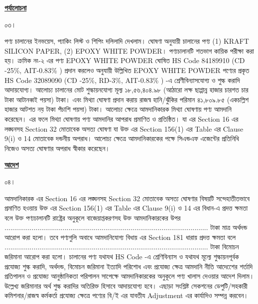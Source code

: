 \documentclass[12pt]{article}
\begin{document}
\begin{center}
\textbf{\underline{পর্যালোচনা}}
\end{center}
\begin{minipage}[t]{0.05\linewidth}
০৩।
\end{minipage}
\begin{minipage}[t]{0.95\linewidth}
পণ্য চালানের ইনভয়েস, প্যাকিং লিস্ট ও
শিপিং দলিলাদি দেখলাম।
ঘোষণা অনুযায়ী চালানের পণ্য
(1) KRAFT SILICON PAPER,
(2) EPOXY WHITE POWDER।
পণ্যচালানটি শতভাগ কায়িক পরীক্ষা করা হয়।
ক্রমিক নং-২ এর পণ্য
EPOXY WHITE POWDER
ঘোষিত HS Code 84189910
(CD -25\%, AIT-0.83\% )
প্রদান করলেও
{\fsen}
অনুযায়ী উল্লিখিত
EPOXY WHITE POWDER
পণ্যের প্রকৃত HS Code 32089090
(CD -25\%, RD-3\%, AIT-0.83\% ) -এ
শ্রেণীবিন্যাসযোগ্য ও শুল্ক করাদি আদায়যোগ্য।
আলোচ্য চালানের মোট
শুল্কায়নযোগ্য মূল্য
১৮,৫৬,৪০৪.৯৮ (আঠারো লক্ষ ছাপ্পান্ন হাজার চারশত চার টাকা আটানব্বই পয়সা) টাকা।
এবং মিথ্যা ঘোষণা প্রদান করায় রাজস্ব হানি/ঝুঁকির পরিমান
৪১,৮০৯.৮৫
(একচল্লিশ হাজার আটশত নয় টাকা পঁচাশি পয়সা) টাকা।
আলোচ্য ক্ষেত্রে আমদানিকারক মিথ্যা ঘোষণায়
পণ্য আমদানি করেছেন।
এর ফলে মিথ্যা ঘোষণায় পণ্য আমদানির আপরাধ
প্রমাণিত ও প্রতিষ্ঠিত।
যা {\tca} এর Section 16 এর
লঙ্ঘনসহ Section 32 মোতাবেক
অসত্য ঘোষণা যা উক্ত {\tca}
এর Section 156(1) এর Table এর
Clause 9(i) ও 14 মোতাবেক দন্ডনীয় অপরাধ।
আলোচ্য ক্ষেত্রে আমদানিকারকের পক্ষে সিএন্ডএফ
এজেন্টের প্রতিনিধি নিজেও অসত্য ঘোষণার অপরাধ
স্বীকার করেছেন।
\end{minipage}
\begin{center}
\textbf{\underline{আদেশ}}
\end{center}
\begin{minipage}[t]{0.05\linewidth}
০৪।
\end{minipage}
\begin{minipage}[t]{0.95\linewidth}
আমদানিকারক {\tca} এর Section 16
এর লঙ্ঘনসহ Section 32 মোতাবেক
অসত্য ঘোষণার বিষয়টি সন্দেহাতীতভাবে প্রমাণিত
হওয়ায় উক্ত {\tca} এর Section 156(1) এর
Table এর Clause 9(i) ও 14 এর বিধান-এ প্রদত্ত
ক্ষমতা বলে উক্ত পণ্যচালানটি
রাষ্ট্রের অনুকূলে বাজেয়াপ্তকরণসহ উক্ত আমদানিকারকের
উপর
......................................................................................................... টাকা
মাত্র অর্থদন্ড আরোপ করা হলো। তবে পণ্যগুলি অবাধে আমদানিযোগ্য
বিধায় {\tca} এর Section 181 ধারায় প্রদত্ত ক্ষমতা
বলে
......................................................................................................... টাকা
বিমোচন জরিমানা আরোপ করা হলো।
চালানের পণ্য যথাযথ HS Code -এ শ্রেণিবিন্যাস ও যথাযথ
মূল্যে শুল্কায়নপূর্বক প্রযোজ্য শুল্ক করাদি, অর্থদন্ড, বিমোচন জরিমানা
ইত্যাদি পরিশোধ এবং প্রযোজ্য ক্ষেত্র আমদানি নীতি আদেশেের
শর্তাদি প্রতিপালন ও প্রযোজ্য আনুষ্ঠানিকতা পরিপালন সাপেক্ষে
আমদানিকারকের অনুকূলে পণ্য খালাস দেওয়ার আদেশ দিলাম।
উল্লেখ্য জরিমানার অর্থ শুল্ক করাদির অতিরিক্ত হিসাবে আদায়যোগ্য
হবে। এছাড়া সংশ্লিষ্ট সেকশনের ডেপুটি/সহকারী কমিশনার/রাজস্ব কর্মকর্তা
প্রযোজ্য ক্ষেত্রে পণ্যের বি/ই এর যাবতীয Adjustment এর কার্যাদিও সম্পন্ন করবেন।
\\
\\
\\
\\
\\
\end{minipage}
\end{document}
